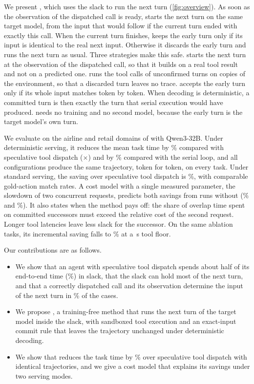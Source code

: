 We present \method, which uses the slack to run the next turn (\cref{fig:overview}).
As soon as the observation of the dispatched call is ready, \method starts the next turn on the same target model, from the input that would follow if the current turn ended with exactly this call.
When the current turn finishes, \method keeps the early turn only if its input is identical to the real next input.
Otherwise it discards the early turn and runs the next turn as usual.
Three strategies make this safe.
\stratLaunch starts the next turn at the observation of the dispatched call, so that it builds on a real tool result and not on a predicted one.
\stratSandbox runs the tool calls of unconfirmed turns on copies of the environment, so that a discarded turn leaves no trace.
\stratCommit accepts the early turn only if its whole input matches token by token.
When decoding is deterministic, a committed turn is then exactly the turn that serial execution would have produced.
\method needs no training and no second model, because the early turn is the target model's own turn.

We evaluate \method on the airline and retail domains of \taubench with Qwen3-32B.
Under deterministic serving, it reduces the mean task time by \DetSaveOursDisp\% compared with speculative tool dispatch (\DetSpeedOursDisp$\times$) and by \DetSaveOursNone\% compared with the serial loop, and all configurations produce the same trajectory, token for token, on every task.
Under standard serving, the saving over speculative tool dispatch is \StdSaveOursDisp\%, with comparable gold-action match rates.
A cost model with a single measured parameter, the slowdown of two concurrent requests, predicts both savings from runs without \method (\CostDetPred\% and \CostStdPred\%).
It also states when the method pays off: the share of overlap time spent on committed successors must exceed the relative cost of the second request.
Longer tool latencies leave less slack for the successor. On the same ablation tasks, its incremental saving falls to \ToolHighIncrement\% at a \ToolHighFloor\,s tool floor.

Our contributions are as follows.
\begin{itemize}[leftmargin=*,itemsep=2pt,topsep=3pt]
\item We show that an agent with speculative tool dispatch spends about half of its end-to-end time (\MotSlackWallPct\%) in slack, that the slack can hold most of the next turn, and that a correctly dispatched call and its observation determine the input of the next turn in \MotInputSamePct\% of the cases.
\item We propose \method, a training-free method that runs the next turn of the target model inside the slack, with sandboxed tool execution and an exact-input commit rule that leaves the trajectory unchanged under deterministic decoding.
\item We show that \method reduces the task time by \DetSaveOursDisp\% over speculative tool dispatch with identical trajectories, and we give a cost model that explains its savings under two serving modes.
\end{itemize}

